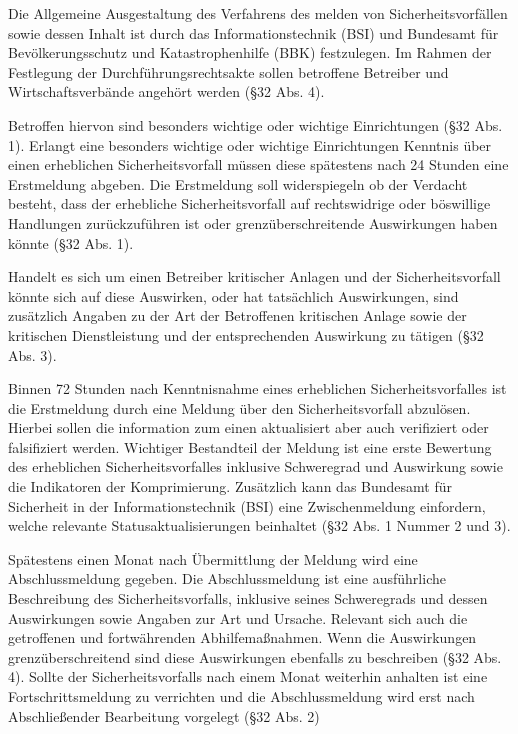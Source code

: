 \documentclass[11pt,a4paper]{article}   %
\begin{document}
        Die Allgemeine Ausgestaltung des Verfahrens des melden von Sicherheitsvorfällen sowie dessen Inhalt ist durch das Informationstechnik (BSI) und Bundesamt für Bevölkerungsschutz und Katastrophenhilfe (BBK) festzulegen. Im Rahmen der Festlegung der Durchführungsrechtsakte sollen betroffene Betreiber und Wirtschaftsverbände angehört werden (§32 Abs. 4).  

        Betroffen hiervon sind besonders wichtige oder wichtige Einrichtungen (§32 Abs. 1). Erlangt eine besonders wichtige oder wichtige Einrichtungen Kenntnis über einen erheblichen Sicherheitsvorfall müssen diese spätestens nach 24 Stunden eine Erstmeldung abgeben. Die Erstmeldung soll widerspiegeln ob der Verdacht besteht, dass der erhebliche Sicherheitsvorfall auf rechtswidrige oder böswillige Handlungen zurückzuführen ist oder grenzüberschreitende Auswirkungen haben könnte (§32 Abs. 1).

        Handelt es sich um einen Betreiber kritischer Anlagen und der Sicherheitsvorfall könnte sich auf diese Auswirken, oder hat tatsächlich Auswirkungen, sind zusätzlich Angaben zu der Art der Betroffenen kritischen Anlage sowie der kritischen Dienstleistung und der entsprechenden Auswirkung zu tätigen (§32 Abs. 3).

        Binnen 72 Stunden nach Kenntnisnahme eines erheblichen Sicherheitsvorfalles ist die Erstmeldung durch eine Meldung über den Sicherheitsvorfall abzulösen. Hierbei sollen die information zum einen aktualisiert aber auch verifiziert oder falsifiziert werden. Wichtiger Bestandteil der Meldung ist eine erste Bewertung des erheblichen Sicherheitsvorfalles inklusive Schweregrad und Auswirkung sowie die Indikatoren der Komprimierung. Zusätzlich kann das Bundesamt für Sicherheit in der Informationstechnik (BSI) eine Zwischenmeldung einfordern, welche relevante Statusaktualisierungen beinhaltet (§32 Abs. 1 Nummer 2 und 3). 

        Spätestens einen Monat nach Übermittlung der Meldung wird eine Abschlussmeldung gegeben. Die Abschlussmeldung ist eine ausführliche  Beschreibung des Sicherheitsvorfalls, inklusive seines Schweregrads und dessen Auswirkungen sowie Angaben zur Art und Ursache. Relevant sich auch die getroffenen und fortwährenden Abhilfemaßnahmen. Wenn die Auswirkungen grenzüberschreitend sind diese Auswirkungen ebenfalls zu beschreiben (§32 Abs. 4). Sollte der Sicherheitsvorfalls nach einem Monat weiterhin anhalten ist eine Fortschrittsmeldung zu verrichten und die Abschlussmeldung wird erst nach Abschließender Bearbeitung vorgelegt (§32 Abs. 2)
\end{document}

